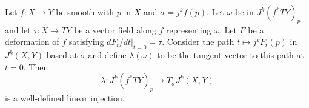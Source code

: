 Let $f: X \to Y$ be smooth with $p$ in $X$ and $\sigma = j^k f(p)$. Let $\omega$ be in $J^k(f^*TY)_p$ and let $\tau: X \to TY$ be a vector field along $f$ representing $\omega$. Let $F$ be a deformation of $f$ satisfying $dF_t/dt|_{t=0} = \tau$. Consider the path $t \mapsto j^k F_t(p)$ in $J^k(X, Y)$ based at $\sigma$ and define $\lambda(\omega)$ to be the tangent vector to this path at $t = 0$. Then
$$\lambda: J^k(f^*TY)_p \to T_\sigma J^k(X, Y)$$
is a well-defined linear injection.
